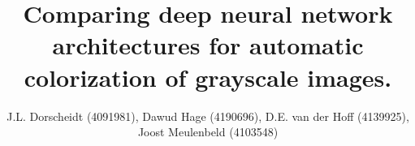 \documentclass[journal,onecolumn]{IEEEtran}
\begin{document}
\title{\LARGE Comparing deep neural network architectures for automatic colorization of grayscale images.}

\author{J.L. Dorscheidt (4091981), Dawud Hage (4190696), D.E. van der Hoff (4139925), Joost Meulenbeld (4103548)}%
\maketitle

%
\begin{abstract}

\end{abstract}


\IEEEpeerreviewmaketitle





\newpage





\newpage
\FloatBarrier


\newpage

\appendices




 
\end{document}
